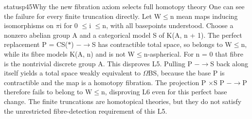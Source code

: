 \begin{dcomment}{status}{p45}{Why the new fibration axiom selects full homotopy theory}
One can see the failure for every finite truncation directly. Let W\ensuremath{\leq}n mean maps inducing isomorphisms on \ensuremath{\pi}i for 0 \ensuremath{\leq}i \ensuremath{\leq}n, with all basepoints understood. Choose a nonzero abelian group A and a categorical model S of K(A, n + 1). The perfect replacement P = CS(\ensuremath{*}) \ensuremath{-}\ensuremath{\to}S has contractible total space, so belongs to W\ensuremath{\leq}n, while its fibre models K(A, n) and is not W\ensuremath{\leq}n-aspherical. For n = 0 that fibre is the nontrivial discrete group A. This disproves L5. Pulling P \ensuremath{-}\ensuremath{\to}S back along itself yields a total space weakly equivalent to \ensuremath{\Omega}BS, because the base P is contractible and the map is a homotopy fibration. The projection P \ensuremath{\times}S P \ensuremath{-}\ensuremath{\to}P therefore fails to belong to W\ensuremath{\leq}n, disproving L6 even for this perfect base change. The finite truncations are homotopical theories, but they do not satisfy the unrestricted fibre-detection requirement of this L5.

\end{dcomment}

